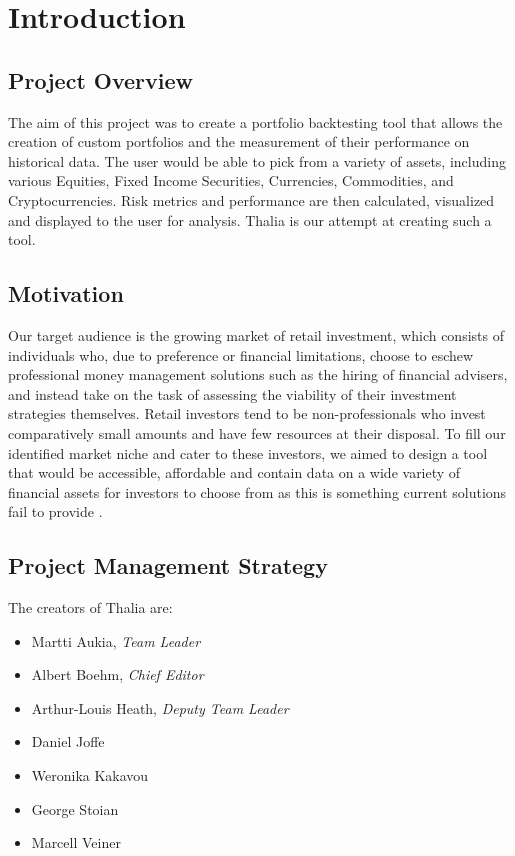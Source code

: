 \documentclass[main.tex]{subfiles}
\begin{document}
\section{Introduction}
\subsection {Project Overview}

The aim of this project was to create a portfolio backtesting tool that allows the creation of custom portfolios and the measurement of their performance on historical data. The user would be able to pick from a variety of assets, including various Equities, Fixed Income Securities, Currencies, Commodities, and Cryptocurrencies. Risk metrics and performance are then calculated, visualized and displayed to the user for analysis. Thalia is our attempt at creating such a tool.

\subsection{Motivation}
Our target audience is the growing market of retail investment, which consists of individuals who, due to preference or financial limitations, choose to eschew professional money management solutions such as the hiring of financial advisers, and instead take on the task of assessing the viability of their investment strategies themselves. Retail investors tend to be non-professionals who invest comparatively small amounts and have few resources at their disposal. To fill our identified market niche and cater to these investors, we aimed to design a tool that would be accessible, affordable and contain data on a wide variety of financial assets for investors to choose from as this is something current solutions fail to provide \cite{WP}.

\subsection{Project Management Strategy}

The creators of Thalia are:
\begin{itemize}
    \item Martti Aukia, \textit{Team Leader}
	\item Albert Boehm, \textit{Chief Editor}
	\item Arthur-Louis Heath, \textit{Deputy Team Leader}
	\item Daniel Joffe
	\item Weronika Kakavou
	\item George Stoian
	\item Marcell Veiner
	
\end{itemize}
\end{document}
